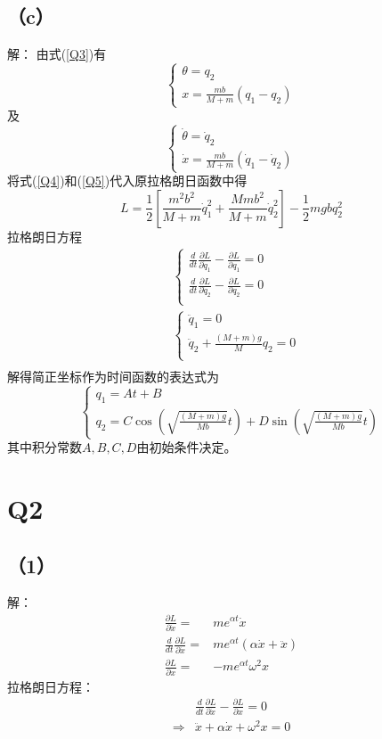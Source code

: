 \documentclass[10pt,a4paper]{article}
\begin{document}
\subsection*{（c）}解：
由式(\ref{Q3})有
\begin{equation}
\label{Q4}
\left\{\begin{array}{ll}
\theta=q_2\\
x=\frac{mb}{M+m}(q_1-q_2)
\end{array}\right.
\end{equation}
及
\begin{equation}
\label{Q5}
\left\{\begin{array}{ll}
\dot{\theta}=\dot{q}_2\\
\dot{x}=\frac{mb}{M+m}(\dot{q}_1-\dot{q}_2)
\end{array}\right.
\end{equation}
将式(\ref{Q4})和(\ref{Q5})代入原拉格朗日函数中得
\[
L=\frac{1}{2}[\frac{m^2b^2}{M+m}\dot{q}_1^2+\frac{Mmb^2}{M+m}\dot{q}_2^2]-\frac{1}{2}mgbq_2^2
\]
拉格朗日方程
\begin{align*}
&\left\{\begin{array}{ll}
\frac{d}{dt}\frac{\partial L}{\partial\dot{q}_1}-\frac{\partial L}{\partial q_1}=0\\
\frac{d}{dt}\frac{\partial L}{\partial\dot{q}_2}-\frac{\partial L}{\partial q_2}=0\\
\end{array}\right.\\
&\left\{\begin{array}{ll}
\ddot{q}_1=0\\
\ddot{q}_2+\frac{(M+m)g}{M}q_2=0\\
\end{array}\right.\\
\end{align*}
解得简正坐标作为时间函数的表达式为
\[
\left\{\begin{array}{ll}
q_1=At+B\\
q_2=C\cos(\sqrt{\frac{(M+m)g}{Mb}}t)+D\sin(\sqrt{\frac{(M+m)g}{Mb}}t)
\end{array}\right.
\]
其中积分常数$A,B,C,D$由初始条件决定。
\section*{Q2}
\subsection*{（1）}解：
\begin{align*}
\frac{\partial L}{\partial\dot{x}}=&me^{\alpha t}\dot{x}\\
\frac{d}{dt}\frac{\partial L}{\partial\dot{x}}=&me^{\alpha t}(\alpha\dot{x}+\ddot{x})\\
\frac{\partial L}{\partial x}=&-me^{\alpha t}\omega^2x
\end{align*}
拉格朗日方程：
\begin{align*}
&\frac{d}{dt}\frac{\partial L}{\partial\dot{x}}-\frac{\partial L}{\partial x}=0\\
\Longrightarrow&\ddot{x}+\alpha\dot{x}+\omega^2x=0
\end{align*}
\end{document}
